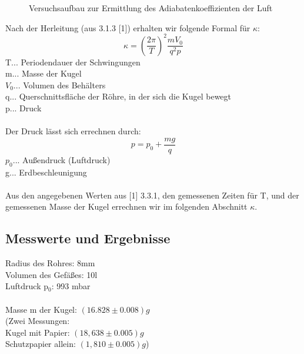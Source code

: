 \documentclass[12pt,a4paper]{article}
\begin{document}
\begin{multicols}{2}
\begin{figure}[H]
	\caption{Versuchsaufbau zur Ermittlung des Adiabatenkoeffizienten der Luft}
	\label{fig:adiabatenkoeffizienten_aufbau}
\end{figure}
\noindent
Nach der Herleitung (aus 3.1.3 [1]) erhalten wir folgende Formal für $\kappa$:
$$\kappa = \left(\frac{2\pi}{T}\right)^2  \frac{m V_0}{q^2  p}$$
T... Periodendauer der Schwingungen\\
m... Masse der Kugel\\
$V_0$... Volumen des Behälters\\
q... Querschnittsfläche der Röhre, in der sich die Kugel bewegt\\
p... Druck\\
\\
Der Druck lässt sich errechnen durch:
$$p = p_0 + \frac{m g}{q}$$
$p_0$... Außendruck (Luftdruck)\\
g... Erdbeschleunigung\\
\\
Aus den angegebenen Werten aus [1] 3.3.1, den gemessenen Zeiten für T, und der gemessenen Masse der Kugel errechnen wir im folgenden Abschnitt $\kappa$.
%
\subsection{Messwerte und Ergebnisse}

Radius des Rohres: 8mm\\
Volumen des Gefäßes: 10l\\
Luftdruck p$_0$: 993 mbar\\
\\
Masse m der Kugel: $(16.828 \pm 0.008)g$ \\
\indent (Zwei Messungen:\\
Kugel mit Papier: $(18,638 \pm 0.005)g$\\
Schutzpapier allein: $(1,810 \pm 0.005)g$)\\


\end{multicols}
\end{document}
